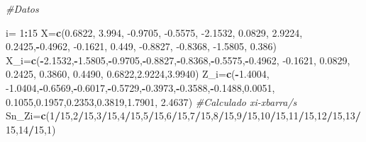 \documentclass[
  a4paper,
  oneside,
  openany]{book}
\newenvironment{Shaded}{\begin{snugshade}}{\end{snugshade}}
\newcommand{\CommentTok}[1]{\textcolor[rgb]{0.56,0.35,0.01}{\textit{#1}}}
\newcommand{\DecValTok}[1]{\textcolor[rgb]{0.00,0.00,0.81}{#1}}
\newcommand{\FloatTok}[1]{\textcolor[rgb]{0.00,0.00,0.81}{#1}}
\newcommand{\KeywordTok}[1]{\textcolor[rgb]{0.13,0.29,0.53}{\textbf{#1}}}
\newcommand{\NormalTok}[1]{#1}
\newcommand{\OperatorTok}[1]{\textcolor[rgb]{0.81,0.36,0.00}{\textbf{#1}}}
\newcommand{\StringTok}[1]{\textcolor[rgb]{0.31,0.60,0.02}{#1}}
\begin{document}
\begin{Shaded}
\begin{Highlighting}[]
\CommentTok{\#Datos}

\NormalTok{i=}\StringTok{ }\DecValTok{1}\OperatorTok{:}\DecValTok{15}
\NormalTok{X=}\KeywordTok{c}\NormalTok{(}\FloatTok{0.6822}\NormalTok{, }\FloatTok{3.994}\NormalTok{, }\FloatTok{{-}0.9705}\NormalTok{, }\FloatTok{{-}0.5575}\NormalTok{, }\FloatTok{{-}2.1532}\NormalTok{, }\FloatTok{0.0829}\NormalTok{, }\FloatTok{2.9224}\NormalTok{,}
    \FloatTok{0.2425}\NormalTok{,}\OperatorTok{{-}}\FloatTok{0.4962}\NormalTok{, }\FloatTok{{-}0.1621}\NormalTok{, }\FloatTok{0.449}\NormalTok{, }\FloatTok{{-}0.8827}\NormalTok{, }\FloatTok{{-}0.8368}\NormalTok{, }\FloatTok{{-}1.5805}\NormalTok{, }\FloatTok{0.386}\NormalTok{)}
\NormalTok{X\_i=}\KeywordTok{c}\NormalTok{(}\OperatorTok{{-}}\FloatTok{2.1532}\NormalTok{,}\OperatorTok{{-}}\FloatTok{1.5805}\NormalTok{,}\OperatorTok{{-}}\FloatTok{0.9705}\NormalTok{,}\OperatorTok{{-}}\FloatTok{0.8827}\NormalTok{,}\OperatorTok{{-}}\FloatTok{0.8368}\NormalTok{,}\OperatorTok{{-}}\FloatTok{0.5575}\NormalTok{,}\OperatorTok{{-}}\FloatTok{0.4962}\NormalTok{, }\FloatTok{{-}0.1621}\NormalTok{,  }\FloatTok{0.0829}\NormalTok{,  }\FloatTok{0.2425}\NormalTok{,}
      \FloatTok{0.3860}\NormalTok{, }\FloatTok{0.4490}\NormalTok{,  }\FloatTok{0.6822}\NormalTok{,}\FloatTok{2.9224}\NormalTok{,}\FloatTok{3.9940}\NormalTok{)}
\NormalTok{Z\_i=}\KeywordTok{c}\NormalTok{(}\OperatorTok{{-}}\FloatTok{1.4004}\NormalTok{, }\FloatTok{{-}1.0404}\NormalTok{,}\OperatorTok{{-}}\FloatTok{0.6569}\NormalTok{,}\OperatorTok{{-}}\FloatTok{0.6017}\NormalTok{,}\OperatorTok{{-}}\FloatTok{0.5729}\NormalTok{,}\OperatorTok{{-}}\FloatTok{0.3973}\NormalTok{,}\OperatorTok{{-}}\FloatTok{0.3588}\NormalTok{,}\OperatorTok{{-}}\FloatTok{0.1488}\NormalTok{,}\FloatTok{0.0051}\NormalTok{,}
\FloatTok{0.1055}\NormalTok{,}\FloatTok{0.1957}\NormalTok{,}\FloatTok{0.2353}\NormalTok{,}\FloatTok{0.3819}\NormalTok{,}\FloatTok{1.7901}\NormalTok{,  }\FloatTok{2.4637}\NormalTok{) }\CommentTok{\#Calculado xi{-}xbarra/s}
\NormalTok{Sn\_Zi=}\KeywordTok{c}\NormalTok{(}\DecValTok{1}\OperatorTok{/}\DecValTok{15}\NormalTok{,}\DecValTok{2}\OperatorTok{/}\DecValTok{15}\NormalTok{,}\DecValTok{3}\OperatorTok{/}\DecValTok{15}\NormalTok{,}\DecValTok{4}\OperatorTok{/}\DecValTok{15}\NormalTok{,}\DecValTok{5}\OperatorTok{/}\DecValTok{15}\NormalTok{,}\DecValTok{6}\OperatorTok{/}\DecValTok{15}\NormalTok{,}\DecValTok{7}\OperatorTok{/}\DecValTok{15}\NormalTok{,}\DecValTok{8}\OperatorTok{/}\DecValTok{15}\NormalTok{,}\DecValTok{9}\OperatorTok{/}\DecValTok{15}\NormalTok{,}\DecValTok{10}\OperatorTok{/}\DecValTok{15}\NormalTok{,}\DecValTok{11}\OperatorTok{/}\DecValTok{15}\NormalTok{,}\DecValTok{12}\OperatorTok{/}\DecValTok{15}\NormalTok{,}\DecValTok{13}\OperatorTok{/}\DecValTok{15}\NormalTok{,}\DecValTok{14}\OperatorTok{/}\DecValTok{15}\NormalTok{,}\DecValTok{1}\NormalTok{)}

\end{Highlighting}
\end{Shaded}
\end{document}
